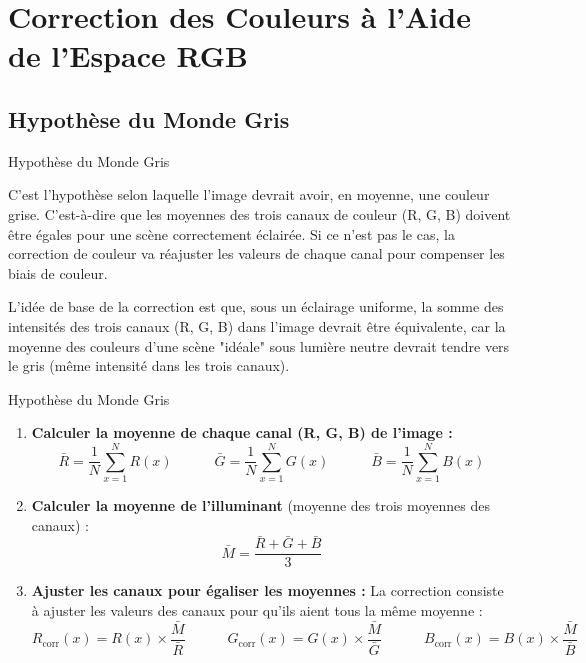 \documentclass[8pt,a4paper]{beamer}
\numberwithin{figure}{section}
\begin{document}
\section{Correction des Couleurs à l'Aide de l'Espace RGB}
\frame{\tableofcontents[currentsection]}
\subsection{Hypothèse du Monde Gris}
\begin{frame}{Hypothèse du Monde Gris}
\par C'est l'hypothèse selon laquelle l'image devrait avoir, en moyenne, une couleur grise. C'est-à-dire que les moyennes des trois canaux de couleur (R, G, B) doivent être égales pour une scène correctement éclairée. Si ce n'est pas le cas, la correction de couleur va réajuster les valeurs de chaque canal pour compenser les biais de couleur.
\vspace{3mm}
\par L'idée de base de la correction est que, sous un éclairage uniforme, la somme des intensités des trois canaux (R, G, B) dans l'image devrait être équivalente, car la moyenne des couleurs d'une scène "idéale" sous lumière neutre devrait tendre vers le gris (même intensité dans les trois canaux).
\end{frame}

\begin{frame}{Hypothèse du Monde Gris}
\begin{enumerate}
    \item \textbf{Calculer la moyenne de chaque canal (R, G, B) de l'image :}
    $$
    \bar{R} = \frac{1}{N} \sum_{x=1}^{N} R(x) \quad\quad\quad \bar{G} = \frac{1}{N} \sum_{x=1}^{N} G(x) \quad\quad\quad \bar{B} = \frac{1}{N} \sum_{x=1}^{N} B(x)
    $$
    
    \item \textbf{Calculer la moyenne de l'illuminant} (moyenne des trois moyennes des canaux) :
    \[
    \bar{M} = \frac{\bar{R} + \bar{G} + \bar{B}}{3}
    \]

    \item \textbf{Ajuster les canaux pour égaliser les moyennes :} La correction consiste à ajuster les valeurs des canaux pour qu'ils aient tous la même moyenne :
    $$
    R_{\text{corr}}(x) = R(x) \times \frac{\bar{M}}{\bar{R}} \quad\quad\quad G_{\text{corr}}(x) = G(x) \times \frac{\bar{M}}{\bar{G}} \quad\quad\quad B_{\text{corr}}(x) = B(x) \times \frac{\bar{M}}{\bar{B}}
    $$
\end{enumerate}
\end{frame}
\end{document}
